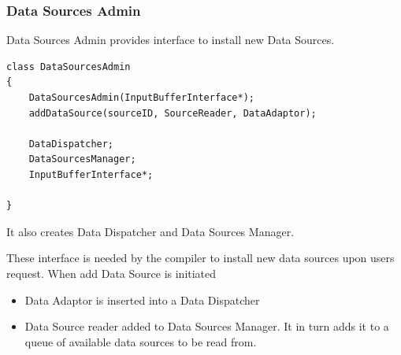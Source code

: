 \documentclass[14pt]{article}
\begin{document}
\subsubsection{Data Sources Admin}

Data Sources Admin provides interface to install new Data Sources.

\begin{verbatim}
class DataSourcesAdmin
{
	DataSourcesAdmin(InputBufferInterface*);
    addDataSource(sourceID, SourceReader, DataAdaptor);

	DataDispatcher;
    DataSourcesManager;
	InputBufferInterface*;

}
\end{verbatim}
 
\noindent It also creates Data Dispatcher and Data Sources Manager.

These interface is needed by the compiler to install new data sources upon users request. When add Data Source is initiated

\begin{itemize}
	\item Data Adaptor is inserted into a Data Dispatcher
	\item Data Source reader added to Data Sources Manager. It in turn adds it to a queue of available data sources to be read from.
\end{itemize}




\end{document}
